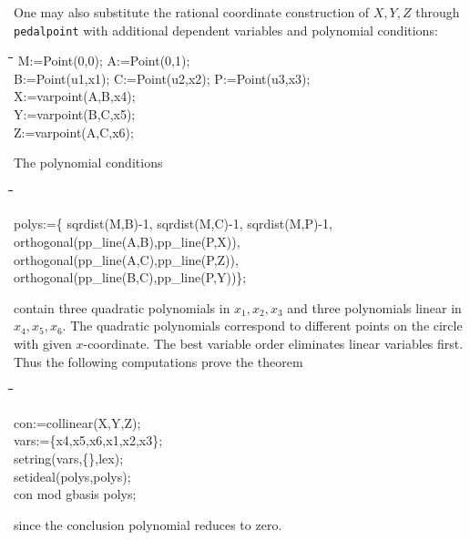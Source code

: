 \documentclass{article}
\newenvironment{code}{\tt \begin{tabbing}
\hspace*{1cm}\=\hspace*{1cm}\=\hspace*{1cm}\=
\hspace*{1cm}\=\hspace*{1cm}\=\kill
}{\end{tabbing}}
\begin{document}
One may also substitute the rational coordinate construction of
$X,Y,Z$ through {\tt pedalpoint} with additional dependent variables
and polynomial conditions:
\begin{code}\>\+
M:=Point(0,0); A:=Point(0,1); \\
B:=Point(u1,x1); C:=Point(u2,x2); P:=Point(u3,x3);\\
X:=varpoint(A,B,x4);\\ Y:=varpoint(B,C,x5);\\ Z:=varpoint(A,C,x6);
\end{code}
The polynomial conditions
\begin{code}
polys:=\{\>\> sqrdist(M,B)-1, sqrdist(M,C)-1, sqrdist(M,P)-1,\+\+\\
	orthogonal(pp\_line(A,B),pp\_line(P,X)),\\
	orthogonal(pp\_line(A,C),pp\_line(P,Z)),\\
	orthogonal(pp\_line(B,C),pp\_line(P,Y))\};
\end{code}
contain three quadratic polynomials in $x_1,x_2,x_3$ and three
polynomials linear in $x_4,x_5,x_6$. The quadratic polynomials
correspond to different points on the circle with given
$x$-coordinate.  The best variable order eliminates linear variables
first. Thus the following computations prove the theorem
\begin{code}
con:=collinear(X,Y,Z);\\[8pt]

vars:=\{x4,x5,x6,x1,x2,x3\};\\
setring(vars,\{\},lex);\\
setideal(polys,polys);\\
con mod gbasis polys;
\end{code}
since the conclusion polynomial reduces to zero.
\medskip
\end{document}
